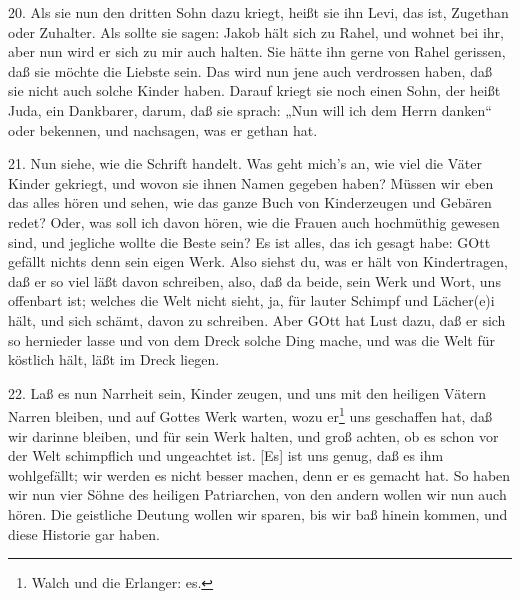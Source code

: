 20. Als sie nun den dritten Sohn dazu kriegt, heißt sie ihn Levi, das ist, Zugethan oder Zuhalter. Als sollte sie sagen: Jakob hält sich zu Rahel, und wohnet bei ihr, aber nun wird er sich zu mir auch halten. Sie hätte ihn gerne von Rahel gerissen, daß sie möchte die Liebste sein. Das wird nun jene auch verdrossen haben, daß sie nicht auch solche Kinder haben. Darauf kriegt sie noch einen Sohn, der heißt Juda, ein Dankbarer, darum, daß sie sprach: „Nun will ich dem Herrn danken“ oder bekennen, und nachsagen, was er gethan hat.

21. Nun siehe, wie die Schrift handelt. Was geht mich’s an, wie viel die Väter Kinder gekriegt, und wovon sie ihnen Namen gegeben haben? Müssen wir eben das alles hören und sehen, wie das ganze Buch von Kinderzeugen und Gebären redet? Oder, was soll ich davon hören, wie die Frauen auch hochmüthig gewesen sind, und jegliche wollte die Beste sein? Es ist alles, das ich gesagt habe: GOtt gefällt nichts denn sein eigen Werk. Also siehst du, was er hält von Kindertragen, daß er so viel läßt davon schreiben, also, daß da beide, sein Werk und Wort, uns offenbart ist; welches die Welt nicht sieht, ja, für lauter Schimpf und Lächer(e)i hält, und sich schämt, davon zu schreiben. Aber GOtt hat Lust dazu, daß er sich so hernieder lasse und von dem Dreck solche Ding mache, und was die Welt für köstlich hält, läßt im Dreck liegen.

22. Laß es nun Narrheit sein, Kinder zeugen, und uns mit den heiligen Vätern Narren bleiben, und auf Gottes Werk warten, wozu er\footnote{Walch und die Erlanger: es.} uns geschaffen hat, daß wir darinne bleiben, und für sein Werk halten, und groß achten, ob es schon vor der Welt schimpflich und ungeachtet ist. [Es] ist uns genug, daß es ihm wohlgefällt; wir werden es nicht besser machen, denn er es gemacht hat. So haben wir nun vier Söhne des heiligen Patriarchen, von den andern wollen wir nun auch hören. Die geistliche Deutung wollen wir sparen, bis wir baß hinein kommen, und diese Historie gar haben.

